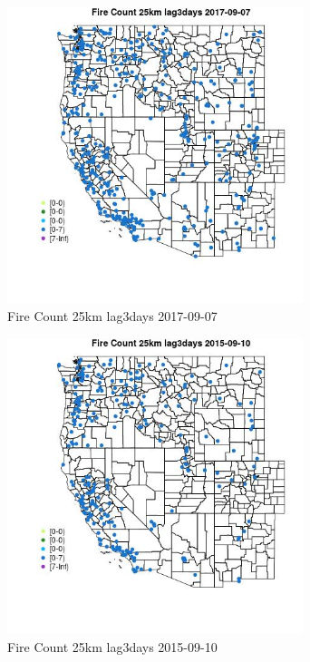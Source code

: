 \begin{figure} 
\centering  
\includegraphics[width=0.77\textwidth]{Code_Outputs/Report_ML_input_PM25_Step4_part_e_de_duplicated_aves_compiled_2019-05-20wNAs_MapObsFire_Count_25km_lag3days2017-09-07.jpg} 
\caption{\label{fig:Report_ML_input_PM25_Step4_part_e_de_duplicated_aves_compiled_2019-05-20wNAsMapObsFire_Count_25km_lag3days2017-09-07}Fire Count 25km lag3days 2017-09-07} 
\end{figure} 
 

\clearpage 

\begin{figure} 
\centering  
\includegraphics[width=0.77\textwidth]{Code_Outputs/Report_ML_input_PM25_Step4_part_e_de_duplicated_aves_compiled_2019-05-20wNAs_MapObsFire_Count_25km_lag3days2015-09-10.jpg} 
\caption{\label{fig:Report_ML_input_PM25_Step4_part_e_de_duplicated_aves_compiled_2019-05-20wNAsMapObsFire_Count_25km_lag3days2015-09-10}Fire Count 25km lag3days 2015-09-10} 
\end{figure} 
 

